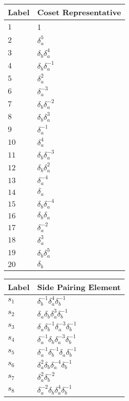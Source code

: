 \documentclass{article}
\begin{document}
\begin{center}
\begin{tabular}{ll}
\toprule
Label & Coset Representative\\
\midrule
$1$ & 1 \\
$2$ & $\delta_a^{5}$ \\
$3$ & $\delta_b^{}\delta_a^{4}$ \\
$4$ & $\delta_b^{}\delta_a^{-1}$ \\
$5$ & $\delta_a^{2}$ \\
$6$ & $\delta_a^{-3}$ \\
$7$ & $\delta_b^{}\delta_a^{-2}$ \\
$8$ & $\delta_b^{}\delta_a^{3}$ \\
$9$ & $\delta_a^{-1}$ \\
$10$ & $\delta_a^{4}$ \\
$11$ & $\delta_b^{}\delta_a^{-3}$ \\
$12$ & $\delta_b^{}\delta_a^{2}$ \\
$13$ & $\delta_a^{-4}$ \\
$14$ & $\delta_a^{}$ \\
$15$ & $\delta_b^{}\delta_a^{-4}$ \\
$16$ & $\delta_b^{}\delta_a^{}$ \\
$17$ & $\delta_a^{-2}$ \\
$18$ & $\delta_a^{3}$ \\
$19$ & $\delta_b^{}\delta_a^{5}$ \\
$20$ & $\delta_b^{}$ \\
\bottomrule
\end{tabular}
\hfill
\begin{tabular}{ll}
\toprule
Label & Side Pairing Element\\
\midrule
$s_{1}$ & $\delta_b^{-1}\delta_a^{4}\delta_b^{-1}$ \\
$s_{2}$ & $\delta_a^{}\delta_b^{}\delta_a^{3}\delta_b^{-1}$ \\
$s_{3}$ & $\delta_a^{}\delta_b^{-1}\delta_a^{-3}\delta_b^{-1}$ \\
$s_{4}$ & $\delta_a^{-1}\delta_b^{}\delta_a^{-3}\delta_b^{-1}$ \\
$s_{5}$ & $\delta_a^{-1}\delta_b^{-1}\delta_a^{}\delta_b^{-1}$ \\
$s_{6}$ & $\delta_a^{2}\delta_b^{}\delta_a^{-4}\delta_b^{-1}$ \\
$s_{7}$ & $\delta_a^{2}\delta_b^{-2}$ \\
$s_{8}$ & $\delta_a^{-2}\delta_b^{}\delta_a^{4}\delta_b^{-1}$ \\

\end{tabular}
\end{center}
\end{document}
